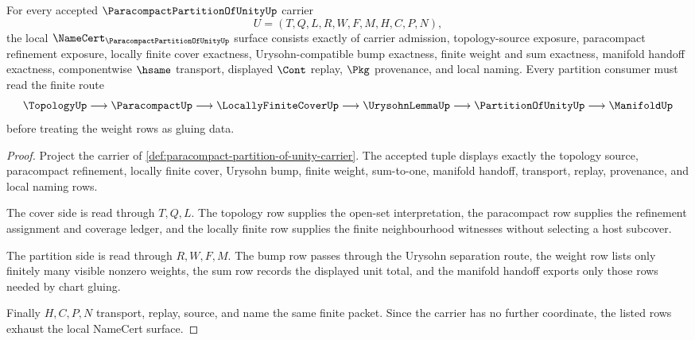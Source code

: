 \begin{theorem}
\label{thm:paracompact-partition-of-unity-namecert-obligations}
For every accepted $\ParacompactPartitionOfUnityUp$ carrier
$$
U=(T,Q,L,R,W,F,M,H,C,P,N),
$$
the local $\NameCert_{\ParacompactPartitionOfUnityUp}$ surface consists exactly of carrier admission, topology-source exposure, paracompact refinement exposure, locally finite cover exactness, Urysohn-compatible bump exactness, finite weight and sum exactness, manifold handoff exactness, componentwise $\hsame$ transport, displayed $\Cont$ replay, $\Pkg$ provenance, and local naming. Every partition consumer must read the finite route
$$
\TopologyUp \longrightarrow \ParacompactUp \longrightarrow \LocallyFiniteCoverUp \longrightarrow \UrysohnLemmaUp \longrightarrow \PartitionOfUnityUp \longrightarrow \ManifoldUp
$$
before treating the weight rows as gluing data.
\end{theorem}
\begin{proof}
Project the carrier of \autoref{def:paracompact-partition-of-unity-carrier}. The accepted tuple displays exactly the topology source, paracompact refinement, locally finite cover, Urysohn bump, finite weight, sum-to-one, manifold handoff, transport, replay, provenance, and local naming rows.

The cover side is read through $T,Q,L$. The topology row supplies the open-set interpretation, the paracompact row supplies the refinement assignment and coverage ledger, and the locally finite row supplies the finite neighbourhood witnesses without selecting a host subcover.

The partition side is read through $R,W,F,M$. The bump row passes through the Urysohn separation route, the weight row lists only finitely many visible nonzero weights, the sum row records the displayed unit total, and the manifold handoff exports only those rows needed by chart gluing.

Finally $H,C,P,N$ transport, replay, source, and name the same finite packet. Since the carrier has no further coordinate, the listed rows exhaust the local NameCert surface.
\end{proof}

